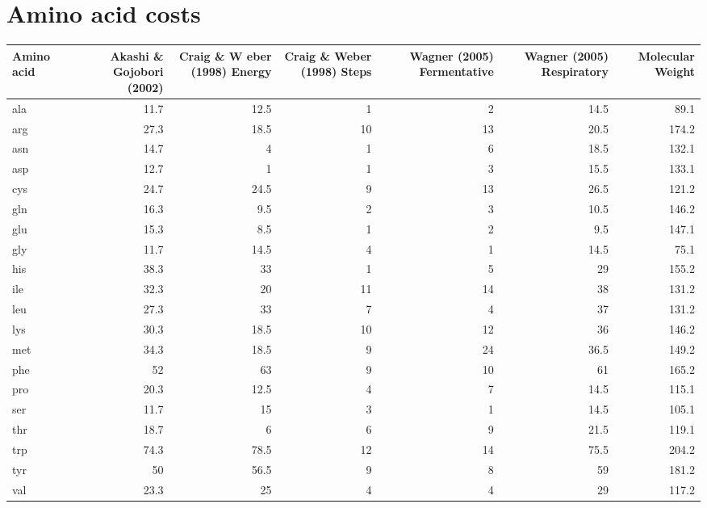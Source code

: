 \section{Amino acid costs}
\label{appendix:amino_acid_costs}

\begin{sidewaystable}
\begin{footnotesize}
  \begin{tabular}{|l| *{6}{r} |}
  \hline
      Amino acid & Akashi \& Gojobori (2002) & Craig \& W
eber (1998) Energy & Craig \& Weber (1998) Steps & Wagner (2005) Fermentative & Wagner (2005) Respiratory & Molecular Weight \\ \hline
      ala & 11.7 & 12.5 & 1 & 2 & 14.5 & 89.1 \\
      arg & 27.3 & 18.5 & 10 & 13 & 20.5 & 174.2 \\
      asn & 14.7 & 4 & 1 & 6 & 18.5 & 132.1 \\
      asp & 12.7 & 1 & 1 & 3 & 15.5 & 133.1 \\
      cys & 24.7 & 24.5 & 9 & 13 & 26.5 & 121.2 \\
      gln & 16.3 & 9.5 & 2 & 3 & 10.5 & 146.2 \\
      glu & 15.3 & 8.5 & 1 & 2 & 9.5 & 147.1 \\
      gly & 11.7 & 14.5 & 4 & 1 & 14.5 & 75.1 \\
      his & 38.3 & 33 & 1 & 5 & 29 & 155.2 \\
      ile & 32.3 & 20 & 11 & 14 & 38 & 131.2 \\
      leu & 27.3 & 33 & 7 & 4 & 37 & 131.2 \\
      lys & 30.3 & 18.5 & 10 & 12 & 36 & 146.2 \\
      met & 34.3 & 18.5 & 9 & 24 & 36.5 & 149.2 \\
      phe & 52 & 63 & 9 & 10 & 61 & 165.2 \\
      pro & 20.3 & 12.5 & 4 & 7 & 14.5 & 115.1 \\
      ser & 11.7 & 15 & 3 & 1 & 14.5 & 105.1 \\
      thr & 18.7 & 6 & 6 & 9 & 21.5 & 119.1 \\
      trp & 74.3 & 78.5 & 12 & 14 & 75.5 & 204.2 \\
      tyr & 50 & 56.5 & 9 & 8 & 59 & 181.2 \\
      val & 23.3 & 25 & 4 & 4 & 29 & 117.2 \\ \hline
  \end{tabular}
\end{footnotesize}
\end{sidewaystable}
